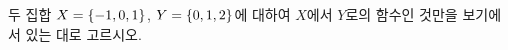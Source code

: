 두 집합 $X=\{-1{,}\mkern3mu\mathopen{}0{,}\mkern3mu\mathopen{}1\}$, $Y=\{0{,}\mkern3mu\mathopen{}1{,}\mkern3mu\mathopen{}2\}$에 대하여 $X$에서 $Y$로의 함수인 것만을 보기에서 있는 대로 고르시오. 
